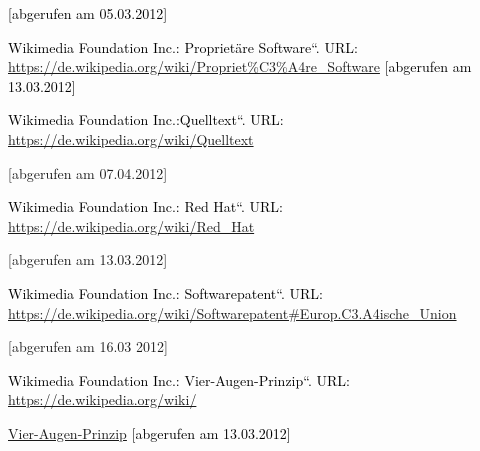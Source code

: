 \documentclass[a4paper]{article}
\newcommand\textstyleInternetlink[1]{\foreignlanguage{english}{\textcolor[rgb]{0.0,0.0,0.5019608}{#1}}}
\begin{document}
{
\textstyleInternetlink{\textcolor{black}{[abgerufen am 05.03.2012]}}}

{
\textstyleInternetlink{\textcolor{black}{Wikimedia Foundation Inc.:
{\quotedblbase}Propriet\"are Software{\textquotedblleft}. URL:
}}\href{https://de.wikipedia.org/wiki/Propriet?re_Software}{\textstyleInternetlink{https://de.wikipedia.org/wiki/Propriet\%C3\%A4re\_Software}}\textstyleInternetlink{\textcolor{black}{
}}\textcolor{black}{[abgerufen am 13.03.2012]}}


\bigskip

{
\textstyleInternetlink{\textcolor{black}{Wikimedia}}\textstyleInternetlink{\textcolor{black}{
}}\textstyleInternetlink{\textcolor{black}{Foundation}}\textstyleInternetlink{\textcolor{black}{
}}\textstyleInternetlink{\textcolor{black}{Inc.:}}\textstyleInternetlink{\textcolor{black}{
{\quotedblbase}}}\textstyleInternetlink{\textcolor{black}{Quelltext}}\textstyleInternetlink{\textcolor{black}{{\textquotedblleft}}}\textstyleInternetlink{\textcolor{black}{.}}\textstyleInternetlink{\textcolor{black}{
}}\textstyleInternetlink{\textcolor{black}{URL:}}\textstyleInternetlink{\textcolor{black}{
}}\url{https://de.wikipedia.org/wiki/Quelltext}}

{\color{black}
[abgerufen am 07.04.2012]}


\bigskip

{
\textstyleInternetlink{\textcolor{black}{Wikimedia Foundation Inc.:
{\quotedblbase}Red Hat{\textquotedblleft}. URL:
}}\url{https://de.wikipedia.org/wiki/Red_Hat}}

{\color{black}
[abgerufen am 13.03.2012]}


\bigskip

{
\textstyleInternetlink{\textcolor{black}{Wikimedia Foundation Inc.:
{\quotedblbase}Softwarepatent{\textquotedblleft}. URL:
}}\url{https://de.wikipedia.org/wiki/Softwarepatent#Europ.C3.A4ische_Union}}

{\color{black}
[abgerufen am 16.03 2012]}


\bigskip

{
\textstyleInternetlink{\textcolor{black}{Wikimedia Foundation Inc.:
{\quotedblbase}Vier-Augen-Prinzip{\textquotedblleft}. URL:
}}\href{https://de.wikipedia.org/wiki/Vier-Augen-Prinzip}{\textstyleInternetlink{https://de.wikipedia.org/wiki/}}}

{
\href{https://de.wikipedia.org/wiki/Vier-Augen-Prinzip}{\textstyleInternetlink{Vier-Augen-Prinzip}}\textstyleInternetlink{\textcolor{black}{
}}\textcolor{black}{[abgerufen am 13.03.2012]}}
\end{document}
